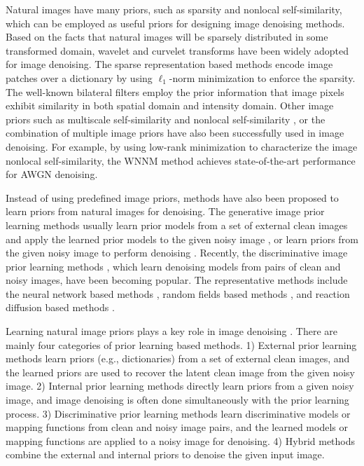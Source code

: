Natural images have many priors, such as sparsity and nonlocal self-similarity, which can be employed as useful priors for designing image denoising methods. Based on the facts that natural images will be sparsely distributed in some transformed domain, wavelet \cite{bayesshrink} and curvelet \cite{curvelet} transforms have been widely adopted for image denoising. The sparse representation based methods \cite{ksvd,lssc,ncsr,bm3d,cbm3d,zhou2012nonparametric} encode image patches over a dictionary by using $\ell_{1}$-norm minimization to enforce the sparsity. The well-known bilateral filters \cite{Tomasi1998} employ the prior information that image pixels exhibit similarity in both spatial domain and intensity domain. Other image priors such as multiscale self-similarity \cite{blsgsm} and nonlocal self-similarity \cite{nlm,nlbayes}, or the combination of multiple image priors \cite{wnnm,pgpd} have also been successfully used in image denoising. For example, by using low-rank minimization to characterize the image nonlocal self-similarity, the WNNM \cite{wnnm} method achieves state-of-the-art performance for AWGN denoising. 

Instead of using predefined image priors, methods have also been proposed to learn priors from natural images for denoising. The generative image prior learning methods usually learn prior models from a set of external clean images and apply the learned prior models to the given noisy image \cite{foe,epll,pgpd}, or learn priors from the given noisy image to perform denoising \cite{ksvd}. Recently, the discriminative image prior learning methods \cite{mlp,xie2012image,dncnn,tnrd,barbu2009training,csf}, which learn denoising models from pairs of clean and noisy images, have been becoming popular. The representative methods include the neural network based methods \cite{mlp,xie2012image,dncnn}, random fields based methods \cite{barbu2009training,csf}, and reaction diffusion based methods \cite{tnrd}.

Learning natural image priors plays a key role in image denoising
\cite{blsgsm,zhou2012nonparametric,ksvd,lssc,ncsr,foe,epll,pgpd,combexin,external,
tid,mlp,xie2012image,dncnn,barbu2009training,csf,tnrd}. There are mainly four categories of prior learning based methods. 1) External prior learning methods \cite{foe,epll,pgpd} learn priors (e.g., dictionaries) from a set of external clean images, and the learned priors are used to recover the latent clean image from the given noisy image. 2) Internal prior learning methods \cite{blsgsm,zhou2012nonparametric,ksvd,lssc,ncsr} directly learn priors from a given noisy image, and image denoising is often done simultaneously with the prior learning process. 3) Discriminative prior learning methods \cite{mlp,xie2012image,dncnn,barbu2009training,
csf,tnrd} learn discriminative models or mapping functions from clean and noisy image pairs, and the learned models or mapping functions are applied to a noisy image for denoising. 4) Hybrid methods \cite{combexin,external,tid} combine the external and internal priors to denoise the given input image.

